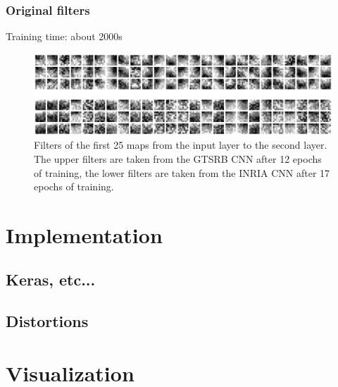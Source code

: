 \documentclass[11pt, a4paper]{article}
\begin{document}
\subsubsection{Original filters}

Training time: about 2000s

\begin{figure}[h!]
	\centering
	\includegraphics[width=1\textwidth]{gtsrb_vs_inria_filters.png}
	\caption{Filters of the first 25 maps from the input layer to the second layer. The upper filters are taken from the GTSRB CNN after 12 epochs of training, the lower filters are taken from the INRIA CNN after 17 epochs of training.}
	\label{fig:gtsrb_vs_coil_filters}
\end{figure}

\begin{appendix}
	\section{Implementation}
	
	\subsection{Keras, etc...}
	
	\subsection{Distortions}
	
	\label{sec:implementation-distortions}
	\section{Visualization}
\end{appendix}

{}

\end{document}
